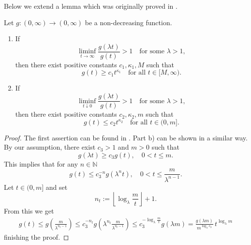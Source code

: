 \documentclass{aptpub}
\newcommand\NN{\mathds N}
\numberwithin{equation}{section}
\begin{document}
Below we extend a lemma which was originally proved in \cite{JKLS12}.
\begin{lem}\label{growth}
Let $g:(0,\infty)\to(0,\infty)$ be a non-decreasing function.
\begin{enumerate}
\item[\upshape a)]
        If
        $$
            \liminf_{t\to\infty}\frac{g(\lambda t)}{g(t)} > 1
            \quad\text{for some $\lambda>1$},
        $$
        then there exist positive constants $c_1,\kappa_1,M$ such that
        $$
            g(t)\geq c_1t^{\kappa_1}
            \quad\text{for all $t\in[M,\infty)$}.
        $$

\item[\upshape b)]
        If
        $$
            \liminf_{t\downarrow0}\frac{g(\lambda t)}{g(t)} > 1
            \quad\text{for some $\lambda>1$},
        $$
        then there exist positive constants $c_2,\kappa_2,m$ such that
        $$
            g(t)\leq c_2t^{\kappa_2}\quad \text{for all $t\in(0,m]$}.
        $$
\end{enumerate}
\end{lem}

\begin{proof}
    The first assertion can be found in \cite[Lemma 3.8]{JKLS12}. Part b) can be shown in a similar way. By our assumption, there exist $c_3>1$ and $m>0$ such that
    $$
        g(\lambda t)\geq c_3g(t),\quad 0<t\leq m.
    $$
    This implies that for any $n\in\NN$
    $$
        g(t)\leq c_3^{-n}g(\lambda^nt),
        \quad 0<t\leq\frac{m}{\lambda^{n-1}}.
    $$
    Let $t\in(0,m]$ and set
    $$
        n_t:=\left\lfloor\log_{\lambda}\frac{m}{t}\right\rfloor+1.
    $$
    From this we get
    \begin{gather*}
        g(t)\leq g\left(\frac{m}{\lambda^{n_t-1}}\right)
        \leq c_3^{-n_t} g\left(\lambda^{n_t}\frac{m}{\lambda^{n_t-1}}\right)
        \leq c_3^{-\log_{\lambda}\frac{m}{t}} g(\lambda m)
        = \frac{g(\lambda m)}{m^{\log_{\lambda}c_3}}\,
        t^{\log_{\lambda}m}
    \end{gather*}
    finishing the proof.
\end{proof}
\end{document}
